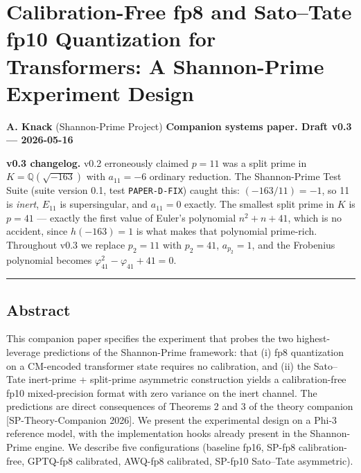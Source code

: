 \documentclass[
  11pt,
]{article}
\author{}
\date{}
\begin{document}
\hypertarget{calibration-free-fp8-and-satotate-fp10-quantization-for-transformers-a-shannon-prime-experiment-design}{%
\section{Calibration-Free fp8 and Sato--Tate fp10 Quantization for
Transformers: A Shannon-Prime Experiment
Design}\label{calibration-free-fp8-and-satotate-fp10-quantization-for-transformers-a-shannon-prime-experiment-design}}

\textbf{A. Knack} (Shannon-Prime Project) \textbf{Companion systems
paper. Draft v0.3 --- 2026-05-16}

\textbf{v0.3 changelog.} v0.2 erroneously claimed \(p = 11\) was a split
prime in \(K = \mathbb{Q}(\sqrt{-163})\) with \(a_{11} = -6\) ordinary
reduction. The Shannon-Prime Test Suite (suite version 0.1, test
\texttt{PAPER-D-FIX}) caught this: \((-163/11) = -1\), so 11 is
\emph{inert}, \(E_{11}\) is supersingular, and \(a_{11} = 0\) exactly.
The smallest split prime in \(K\) is \(p = 41\) --- exactly the first
value of Euler's polynomial \(n^2 + n + 41\), which is no accident,
since \(h(-163) = 1\) is what makes that polynomial prime-rich.
Throughout v0.3 we replace \(p_2 = 11\) with \(p_2 = 41\),
\(a_{p_2} = 1\), and the Frobenius polynomial becomes
\(\varphi_{41}^2 - \varphi_{41} + 41 = 0\).

\begin{center}\rule{0.5\linewidth}{0.5pt}\end{center}

\hypertarget{abstract}{%
\subsection{Abstract}\label{abstract}}

This companion paper specifies the experiment that probes the two
highest-leverage predictions of the Shannon-Prime framework: that (i)
fp8 quantization on a CM-encoded transformer state requires no
calibration, and (ii) the Sato--Tate inert-prime + split-prime
asymmetric construction yields a calibration-free fp10 mixed-precision
format with zero variance on the inert channel. The predictions are
direct consequences of Theorems 2 and 3 of the theory companion
{[}SP-Theory-Companion 2026{]}. We present the experimental design on a
Phi-3 reference model, with the implementation hooks already present in
the Shannon-Prime engine. We describe five configurations (baseline
fp16, SP-fp8 calibration-free, GPTQ-fp8 calibrated, AWQ-fp8 calibrated,
SP-fp10 Sato--Tate asymmetric).
\end{document}

